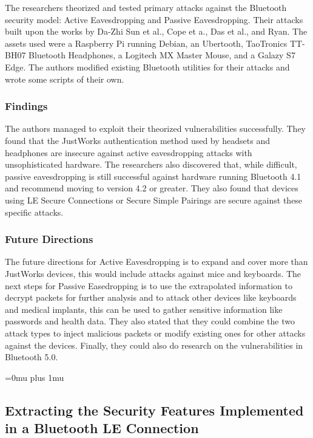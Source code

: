 \documentclass[letterpaper,12pt]{article}
\begin{document}
\noindent
The researchers theorized and tested primary attacks against the Bluetooth security model: Active Eavesdropping and Passive Eavesdropping.  Their attacks built upon the works by Da-Zhi Sun et al., Cope et a., Das et al., and Ryan.  The assets used were a Raspberry Pi running Debian, an Ubertooth, TaoTronics TT-BH07 Bluetooth Headphones, a Logitech MX Master Mouse, and a Galazy S7 Edge.  The authors modified existing Bluetooth utilities for their attacks and wrote some scripts of their own.

\subsubsection{Findings}

\noindent
The authors managed to exploit their theorized vulnerabilities successfully.  They found that the JustWorks authentication method used by headsets and headphones are insecure against active eavesdropping attacks with unsophisticated hardware.  The researchers also discovered that, while difficult, passive eavesdropping is still successful against hardware running Bluetooth 4.1 and recommend moving to version 4.2 or greater.  They also found that devices using LE Secure Connections or Secure Simple Pairings are secure against these specific attacks.

\subsubsection{Future Directions}

\noindent
The future directions for Active Eavesdropping is to expand and cover more than JustWorks devices, this would include attacks against mice and keyboards.  The next steps for Passive Easedropping is to use the extrapolated information to decrypt packets for further analysis and to attack other devices like keyboards and medical implants, this can be used to gather sensitive information like passwords and health data.  They also stated that they could combine the two attack types to inject malicious packets or modify existing ones for other attacks against the devices.  Finally, they could also do research on the vulnerabilities in Bluetooth 5.0.

\Urlmuskip=0mu plus 1mu\relax

\subsection{Extracting the Security Features Implemented in a Bluetooth LE Connection}
\end{document}
